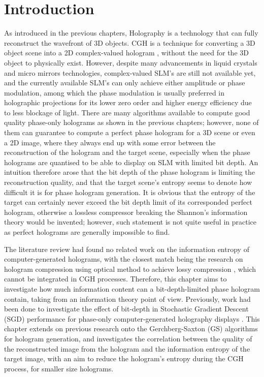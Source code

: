 \section{Introduction}
	As introduced in the previous chapters, Holography is a technology that can fully reconstruct the wavefront of 3D objects. CGH is a technique for converting a 3D object scene into a 2D complex-valued hologram \cite{Tsang2018}, without the need for the 3D object to physically exist. However, despite many advancements in liquid crystals and micro mirrors technologies, complex-valued SLM's are still not available yet, and the currently available SLM's can only achieve either amplitude or phase modulation, among which the phase modulation is usually preferred in holographic projections for its lower zero order and higher energy efficiency due to less blockage of light. There are many algorithms available to compute good quality phase-only holograms as shown in the previous chapters; however, none of them can guarantee to compute a perfect phase hologram for a 3D scene or even a 2D image, where they always end up with some error between the reconstruction of the hologram and the target scene, especially when the phase holograms are quantised to be able to display on SLM with limited bit depth. An intuition therefore arose that the bit depth of the phase hologram is limiting the reconstruction quality, and that the target scene's entropy seems to denote how difficult it is for phase hologram generation. It is obvious that the entropy of the target can certainly never exceed the bit depth limit of its corresponded perfect hologram, otherwise a lossless compressor breaking the Shannon's information theory \cite{Shannon1948} would be invented; however, such statement is not quite useful in practice as perfect holograms are generally impossible to find.

	The literature review had found no related work on the information entropy of computer-generated holograms, with the closest match being the research on hologram compression using optical method to achieve lossy compression \cite{Kollin1988}, which cannot be integrated in CGH processes. Therefore, this chapter aims to investigate how much information content can a bit-depth-limited phase hologram contain, taking from an information theory point of view. Previously, work had been done to investigate the effect of bit-depth in Stochastic Gradient Descent (SGD) performance for phase-only computer-generated holography displays \cite{Kadis2022}. This chapter extends on previous research onto the Gerchberg-Saxton (GS) \cite{Gerchberg1972} algorithms for hologram generation, and investigates the correlation between the quality of the reconstructed image from the hologram and the information entropy of the target image, with an aim to reduce the hologram's entropy during the CGH process, for smaller size holograms.


